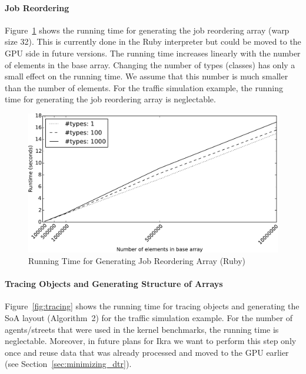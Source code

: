 \documentclass[preprint]{sigplanconf}
\begin{document}
\paragraph{Job Reordering}
Figure~\ref{fig:job_reorder_arr} shows the running time for generating the job reordering array (warp size 32). This is currently done in the Ruby interpreter but could be moved to the GPU side in future versions. The running time increases linearly with the number of elements in the base array. Changing the number of types (classes) has only a small effect on the running time. We assume that this number is much smaller than the number of elements. For the traffic simulation example, the running time for generating the job reordering array is neglectable.

\begin{figure}[!htp]
    \includegraphics[width=\columnwidth]{plot_reorder.pdf}
    \centering
    \caption{Running Time for Generating Job Reordering Array (Ruby)}
    \label{fig:job_reorder_arr}
\end{figure}

\paragraph{Tracing Objects and Generating Structure of Arrays}
Figure~\ref{fig:tracing} shows the running time for tracing objects and generating the SoA layout (Algorithm~2) for the traffic simulation example. For the number of agents/streets that were used in the kernel benchmarks, the running time is neglectable. Moreover, in future plans for Ikra we want to perform this step only once and reuse data that was already processed and moved to the GPU earlier (see Section~\ref{sec:minimizing_dtr}).
\end{document}
